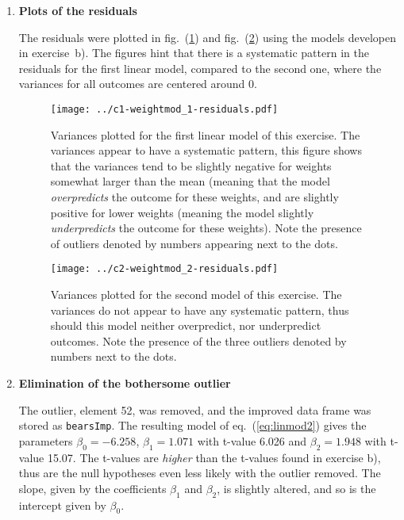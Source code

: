\documentclass[a4paper,11pt]{article}
\begin{document}
\begin{enumerate}[label=\alph*)]
    \item \textbf{Plots of the residuals}

        The residuals were plotted in fig.~(\ref{fig:c1}) and fig.~(\ref{fig:c2}) using the models developen in exercise~b). The figures hint that there is a systematic pattern in the residuals for the first linear model, compared to the second one, where the variances for all outcomes are centered around 0.  

        \begin{figure}[htb]
            \centering
            \texttt{[image: ../c1-weightmod\_1-residuals.pdf]}
            \caption{Variances plotted for the first linear model of this exercise. The variances appear to have a systematic pattern, this figure shows that the variances tend to be slightly negative for weights somewhat larger than the mean (meaning that the model \textit{overpredicts} the outcome for these weights, and are slightly positive for lower weights (meaning the model slightly \textit{underpredicts} the outcome for these weights). Note the presence of outliers denoted by numbers appearing next to the dots. }
            \label{fig:c1}
        \end{figure}

        \begin{figure}[htb]
            \centering
        \texttt{[image: ../c2-weightmod\_2-residuals.pdf]}
            \caption{Variances plotted for the second model of this exercise. The variances do not appear to have any systematic pattern, thus should this model neither overpredict, nor underpredict outcomes. Note the presence of the three outliers denoted by numbers next to the dots.}
            \label{fig:c2}
        \end{figure}

    \item \textbf{Elimination of the bothersome outlier}

        The outlier, element 52, was removed, and the improved data frame was stored as \texttt{bearsImp}. The resulting model of eq.~(\ref{eq:linmod2}) gives the parameters $\beta_0 = -6.258$, $\beta_1 = 1.071$ with t-value 6.026 and $\beta_2 = 1.948$ with t-value 15.07. The t-values are \textit{higher} than the t-values found in exercise b), thus are the null hypotheses even less likely with the outlier removed. The slope, given by the coefficients $\beta_1$ and $\beta_2$, is slightly altered, and so is the intercept given by $\beta_0$.  
\end{enumerate}
\end{document}
